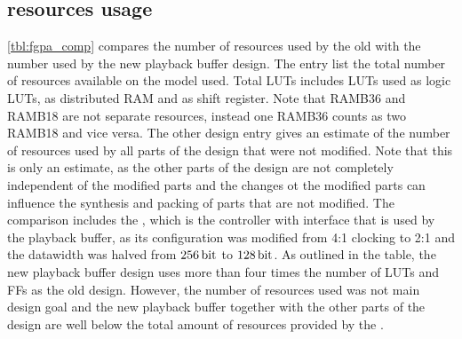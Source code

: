 \subsection{\FPGA{} resources usage}
\autoref{tbl:fgpa_comp} compares the number of \FPGA{} resources used by the old with the number used by the new playback buffer design. The \FPGA{} entry list the total number of resources available on the \FPGA{} model used. Total LUTs includes LUTs used as logic LUTs, as distributed RAM and as shift register. Note that RAMB36 and RAMB18 are not separate resources, instead one RAMB36 counts as two RAMB18 and vice versa.
The other \FPGA{} design entry gives an estimate of the number of resources used by all parts of the \FPGA{} design that were not modified. Note that this is only an estimate, as the other parts of the design are not completely independent of the modified parts and the changes ot the modified parts can influence the synthesis and packing of parts that are not modified.
The comparison includes the \XilinxMIG{}, which is the \DDR{} controller with \AXI{} interface that is used by the playback buffer, as its configuration was modified from 4:1 clocking to 2:1 and the datawidth was halved from $\SI{256}{\bit}$ to $\SI{128}{\bit}$.
As outlined in the table, the new playback buffer design uses more than four times the number of LUTs and FFs as the old design. However, the number of resources used was not main design goal and the new playback buffer together with the other parts of the \FPGA{} design are well below the total amount of resources provided by the \FPGA{}.
